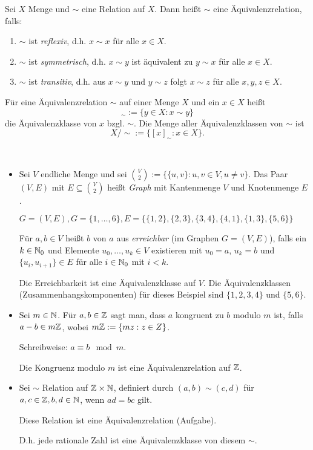 \begin{defn}
Sei $ X $ Menge und $ \sim $ eine Relation auf $ X $. Dann heißt $ \sim $ eine Äquivalenzrelation, falls:
\begin{enumerate}
	\item $ \sim $ ist \emph{reflexiv}, d.h. $ x \sim x $ für alle $ x \in X $.
	\item $ \sim $ ist \emph{symmetrisch}, d.h. $ x \sim y $ ist äquivalent zu $ y \sim x $ für alle $ x \in X $.
	\item $ \sim $ ist \emph{transitiv}, d.h. aus $ x \sim y $ und $ y \sim z $ folgt $ x \sim z $ für alle $ x,y,z \in X $.
\end{enumerate}
Für eine Äquivalenzrelation $ \sim $ auf einer Menge $ X $ und ein $ x \in X $ heißt
\begin{equation*}
	[x]_\sim := \{ y \in X : x \sim y \}
\end{equation*}
die Äquivalenzklasse von $ x $ bzgl. $ \sim $. Die Menge aller Äquivalenzklassen von $ \sim $ ist
\begin{equation*}
	X/{\sim} := \{ [x]_\sim : x \in X \}. %
\end{equation*}
\end{defn} 

\begin{bsp}\
\begin{itemize}
	\item Sei $ V $ endliche Menge und sei $ \binom{V}{2} := \{ \{ u,v \} : u,v \in V, u \neq v \} $. Das Paar $ (V,E) $ mit $ E \subseteq \binom{V}{2} $ heißt \emph{Graph} mit Kantenmenge $ V $ und Knotenmenge $ E $.
	
	$ G = (V,E), G = \{ 1,\ldots,6 \}, E = \{ \{ 1,2 \}, \{ 2,3 \}, \{ 3,4 \}, \{ 4,1 \}, \{ 1,3 \}, \{ 5,6 \} \} $
	
	Für $ a,b \in V $ heißt $ b $ von $ a $ aus \emph{erreichbar} (im Graphen $ G = (V,E) $), falls ein $ k \in \mathbb{N}_0 $ und Elemente $ u_0,\ldots,u_k \in V $ existieren mit $ u_0 = a $, $ u_k = b $ und $ \{ u_i,u_{i+1} \} \in E $ für alle $ i \in \mathbb{N}_0 $ mit $ i < k $.
	
	Die Erreichbarkeit ist eine Äquivalenzklasse auf $ V $.	Die Äquivalenzklassen (Zusammenhangskomponenten) für dieses Beispiel sind $ \{ 1,2,3,4 \} $ und $ \{ 5,6 \} $.
	
	\item Sei $ m \in \mathbb{N} $. Für $ a,b \in \mathbb{Z} $ sagt man, dass $ a $ kongruent zu $ b $ modulo $ m $ ist, falls $ a-b \in m\mathbb{Z} $, wobei $ m\mathbb{Z} := \{ mz : z \in Z \} $.
	
	Schreibweise: $ a \equiv b \mod{m} $.
	
	Die Kongruenz modulo $ m $ ist eine Äquivalenzrelation auf $ \mathbb{Z} $.
	
	\item Sei $ \sim $ Relation auf $ \mathbb{Z} \times \mathbb{N} $, definiert durch $ (a,b) \sim (c,d) $ für $ a,c \in \mathbb{Z}, b,d \in \mathbb{N} $, wenn $ ad = bc $ gilt.
	
	Diese Relation ist eine Äquivalenzrelation (Aufgabe).
	
	D.h. jede rationale Zahl ist eine Äquivalenzklasse von diesem $ \sim $.
\end{itemize}
\end{bsp}


